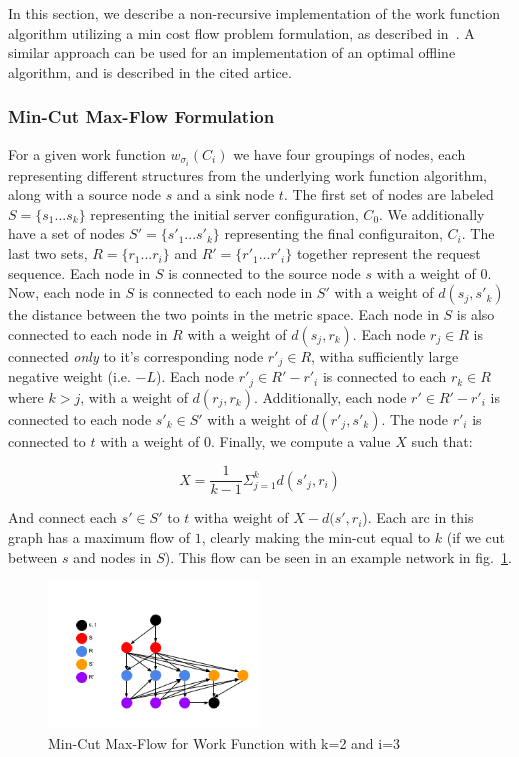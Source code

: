 In this section, we describe a non-recursive implementation of the work function algorithm utilizing a min cost flow problem formulation, as described in~\cite{mcfp2011}. A similar approach can be used for an implementation of an optimal offline algorithm, and is described in the cited artice.

\subsubsection*{Min-Cut Max-Flow Formulation}
For a given work function $w_{\sigma_i}(C_i)$ we have four groupings of nodes, each representing different structures from the underlying work function algorithm, along with a source node $s$ and a sink node $t$. The first set of nodes are labeled $S = \{s_1 ... s_k\}$ representing the initial server configuration, $C_0$. We additionally have a set of nodes $S' = \{s'_1 ... s'_k\}$ representing the final configuraiton, $C_i$. The last two sets, $R = \{r_1 ... r_i\}$ and $R' = \{r'_1 ... r'_i\}$ together represent the request sequence. Each node in $S$ is connected to the source node $s$ with a weight of $0$. Now, each node in $S$ is connected to each node in $S'$ with a weight of $d(s_j, s'_k)$ the distance between the two points in the metric space. Each node in $S$ is also connected to each node in $R$ with a weight of $d(s_j, r_k)$. Each node $r_j \in R$ is connected \textit{only} to it's corresponding node $r'_j\in R$, witha sufficiently large negative weight (i.e. $-L$). Each node $r'_j \in R' - r'_i$ is connected to each $r_k \in R$ where $k > j$, with a weight of $d(r_j, r_k)$. Additionally, each node $r' \in R'-r'_i$ is connected to each node $s'_k \in S'$ with a weight of $d(r'_j, s'_k)$. The node $r'_i$ is connected to $t$ with a weight of $0$. Finally, we compute a value $X$ such that:

\begin{equation*}
    X = \frac{1}{k-1} \Sigma_{j=1}^{k} d(s'_j, r_i)
\end{equation*}

And connect each $s' \in S'$ to $t$ witha weight of $X-d(s', r_i$). Each arc in this graph has a maximum flow of $1$, clearly making the min-cut equal to $k$ (if we cut between $s$ and nodes in $S$). This flow can be seen in an example network in fig.~\ref{fig:mcfp}.

\begin{figure}[h]
    \centering
    \includegraphics[width=0.5\textwidth]{images/mcfp.png}
    \caption{Min-Cut Max-Flow for Work Function with k=2 and i=3}
    \label{fig:mcfp}
\end{figure}

